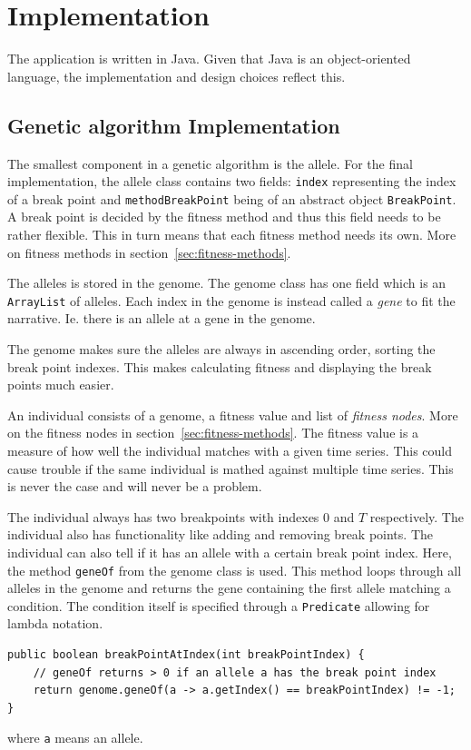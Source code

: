 
\clearpage
\section{Implementation} \label{sec:implementation}

The application is written in Java. Given that Java is an object-oriented
language, the implementation and design choices reflect this. 

\subsection{Genetic algorithm Implementation}

The smallest component in a genetic algorithm is the allele. For the final implementation, the
allele class contains two fields: \texttt{index} representing the index of a
break point and \texttt{methodBreakPoint} being of an abstract object
\texttt{BreakPoint}. A break point is decided by the fitness method and thus
this field needs to be rather flexible. This in turn means that each fitness
method needs its own. More on fitness methods in
section~\ref{sec:fitness-methods}. 

The alleles is stored in the genome. The genome class has one field which is an
\texttt{ArrayList} of alleles. Each index in the genome is instead called a
\textit{gene} to fit the narrative. Ie. there is an allele at a gene in the
genome. 

The genome makes sure the alleles are always in ascending order, sorting the break
point indexes. This makes calculating fitness and displaying the break points
much easier. 

An individual consists of a genome, a fitness value and list of \textit{fitness nodes}.
More on the fitness nodes in section~\ref{sec:fitness-methods}. The fitness
value is a measure of how well the individual matches with a given time series.
This could cause trouble if the same individual is mathed against multiple time
series. This is never the case and will never be a problem. 

The individual always has two breakpoints with indexes $0$ and $T$ respectively.
The individual also has functionality like adding and removing break points. The
individual can also tell if it has an allele with a certain break point index.
Here, the method \texttt{geneOf} from the genome class is used. This method
loops through all alleles in the genome and returns the gene containing the first allele matching a
condition. The condition itself is specified through a \texttt{Predicate}
allowing for lambda notation. 
\begin{lstlisting}
public boolean breakPointAtIndex(int breakPointIndex) {
    // geneOf returns > 0 if an allele a has the break point index
    return genome.geneOf(a -> a.getIndex() == breakPointIndex) != -1;
}
\end{lstlisting}
where \texttt{a} means an allele. 

